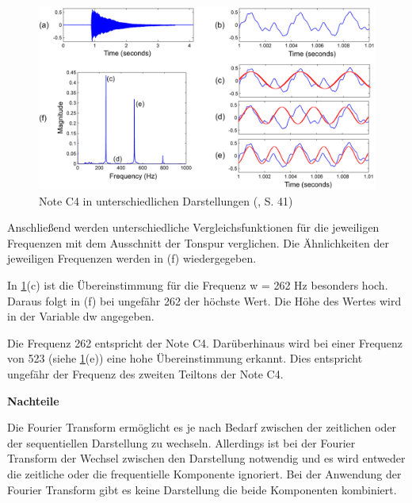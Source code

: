 %
\begin{figure}[h]
    \includegraphics[width=1\textwidth]{images/Fourier_math.PNG}
    \caption{Note C4 in unterschiedlichen Darstellungen (\cite{fundamentals_of_music_processing}, S. 41)}
    \label{fig:fourier}
    \end{figure}
\par

Anschließend werden unterschiedliche Vergleichsfunktionen für die jeweiligen Frequenzen mit dem Ausschnitt der Tonspur verglichen. Die Ähnlichkeiten der jeweiligen Frequenzen werden in (f) wiedergegeben.

\par

In \cref{fig:fourier}(c) ist die Übereinstimmung für die Frequenz w = 262 Hz besonders hoch. Daraus folgt in (f) bei ungefähr 262 der höchste Wert. Die Höhe des Wertes wird in der Variable dw angegeben.


\par

Die Frequenz 262 entspricht der Note C4. Darüberhinaus wird bei einer Frequenz von 523 (siehe \cref{fig:fourier}(e)) eine hohe Übereinstimmung erkannt. Dies entspricht ungefähr der Frequenz des zweiten Teiltons der Note C4.

%
\textbf{Nachteile}
\label{disadvantages_fourier}
%
    
Die Fourier Transform ermöglicht es je nach Bedarf zwischen der zeitlichen oder der sequentiellen Darstellung zu wechseln. Allerdings ist bei der Fourier Transform der Wechsel zwischen den Darstellung notwendig und es wird entweder die zeitliche oder die frequentielle Komponente ignoriert. Bei der Anwendung der Fourier Transform gibt es keine Darstellung die beide Komponenten kombiniert.

